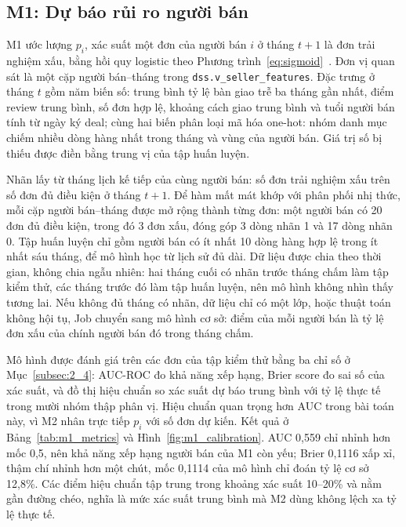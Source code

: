 \documentclass[a4paper]{article}
\begin{document}
\subsection{M1: Dự báo rủi ro người bán}
\label{subsec:5_5}

M1 ước lượng $p_i$, xác suất một đơn của người bán $i$ ở tháng $t+1$ là đơn trải nghiệm xấu, bằng hồi quy logistic theo Phương trình~\eqref{eq:sigmoid}~\cite{bib:sklearn}. Đơn vị quan sát là một cặp người bán--tháng trong \texttt{dss.\allowbreak{}v\_\allowbreak{}seller\_\allowbreak{}features}. Đặc trưng ở tháng $t$ gồm năm biến số: trung bình tỷ lệ bàn giao trễ ba tháng gần nhất, điểm review trung bình, số đơn hợp lệ, khoảng cách giao trung bình và tuổi người bán tính từ ngày ký deal; cùng hai biến phân loại mã hóa one-hot: nhóm danh mục chiếm nhiều dòng hàng nhất trong tháng và vùng của người bán. Giá trị số bị thiếu được điền bằng trung vị của tập huấn luyện.

Nhãn lấy từ tháng lịch kế tiếp của cùng người bán: số đơn trải nghiệm xấu trên số đơn đủ điều kiện ở tháng $t+1$. Để hàm mất mát khớp với phân phối nhị thức, mỗi cặp người bán--tháng được mở rộng thành từng đơn: một người bán có 20 đơn đủ điều kiện, trong đó 3 đơn xấu, đóng góp 3 dòng nhãn 1 và 17 dòng nhãn 0. Tập huấn luyện chỉ gồm người bán có ít nhất 10 dòng hàng hợp lệ trong ít nhất sáu tháng, để mô hình học từ lịch sử đủ dài. Dữ liệu được chia theo thời gian, không chia ngẫu nhiên: hai tháng cuối có nhãn trước tháng chấm làm tập kiểm thử, các tháng trước đó làm tập huấn luyện, nên mô hình không nhìn thấy tương lai. Nếu không đủ tháng có nhãn, dữ liệu chỉ có một lớp, hoặc thuật toán không hội tụ, Job chuyển sang mô hình cơ sở: điểm của mỗi người bán là tỷ lệ đơn xấu của chính người bán đó trong tháng chấm.

Mô hình được đánh giá trên các đơn của tập kiểm thử bằng ba chỉ số ở Mục~\ref{subsec:2_4}: AUC-ROC đo khả năng xếp hạng, Brier score đo sai số của xác suất, và đồ thị hiệu chuẩn so xác suất dự báo trung bình với tỷ lệ thực tế trong mười nhóm thập phân vị. Hiệu chuẩn quan trọng hơn AUC trong bài toán này, vì M2 nhân trực tiếp $p_i$ với số đơn dự kiến. Kết quả ở Bảng~\ref{tab:m1_metrics} và Hình~\ref{fig:m1_calibration}. AUC 0,559 chỉ nhỉnh hơn mốc 0,5, nên khả năng xếp hạng người bán của M1 còn yếu; Brier 0,1116 xấp xỉ, thậm chí nhỉnh hơn một chút, mốc 0,1114 của mô hình chỉ đoán tỷ lệ cơ sở 12,8\%. Các điểm hiệu chuẩn tập trung trong khoảng xác suất 10--20\% và nằm gần đường chéo, nghĩa là mức xác suất trung bình mà M2 dùng không lệch xa tỷ lệ thực tế.
\end{document}
